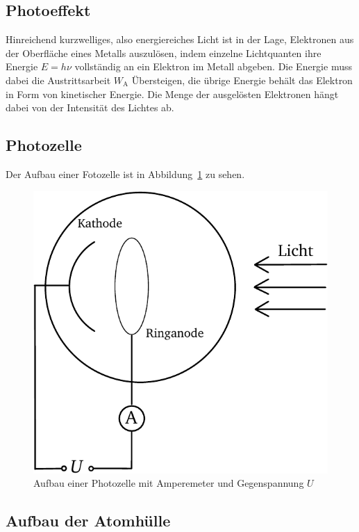 \subsection{Photoeffekt}

Hinreichend kurzwelliges, also energiereiches Licht ist in der Lage, Elektronen
aus der Oberfläche eines Metalls auszulösen, indem einzelne Lichtquanten ihre
Energie $E = h\nu$ vollständig an ein Elektron im Metall abgeben. Die Energie
muss dabei die Austrittsarbeit $W_\text{A}$ Übersteigen, die übrige Energie
behält das Elektron in Form von kinetischer Energie. Die Menge der ausgelösten
Elektronen hängt dabei von der Intensität des Lichtes ab.

\subsection{Photozelle}

Der Aufbau einer Fotozelle ist in Abbildung~\ref{fig:Photozelle} zu sehen.

\begin{figure}
    \centering
    \includegraphics{Zeichnungen/Photozelle.pdf}
    \caption{%
        Aufbau einer Photozelle mit Amperemeter und Gegenspannung $U$
    }
    \label{fig:Photozelle}
\end{figure}

\subsection{Aufbau der Atomhülle}

